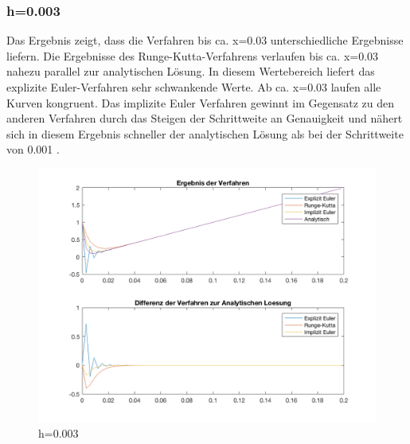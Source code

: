 \documentclass[]{scrartcl}
\begin{document}
\subsubsection{h=0.003}
Das Ergebnis zeigt, dass die Verfahren bis ca. x=0.03 unterschiedliche Ergebnisse liefern. Die Ergebnisse des Runge-Kutta-Verfahrens verlaufen bis ca. x=0.03 nahezu parallel zur analytischen Lösung. In diesem Wertebereich liefert das explizite Euler-Verfahren sehr schwankende Werte. Ab ca. x=0.03 laufen alle Kurven kongruent. Das implizite Euler Verfahren gewinnt im Gegensatz zu den anderen Verfahren durch das Steigen der Schrittweite an Genauigkeit und nähert sich in diesem Ergebnis schneller der analytischen Lösung als bei der Schrittweite von 0.001 .
\begin{figure}[htbp]
	\centering
	\includegraphics[width=1\linewidth]{a1_1_2}
	\caption{h=0.003}
	\label{fig:a1_1_2}
\end{figure}
\end{document}
